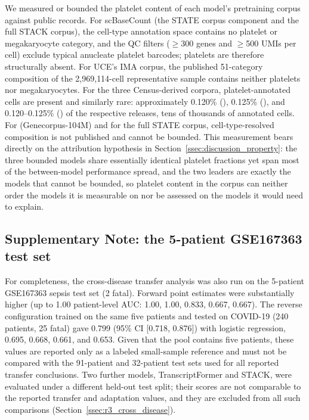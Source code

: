 We measured or bounded the platelet content of each model's pretraining
corpus against public records. For scBaseCount (the STATE corpus component
and the full STACK corpus), the cell-type annotation space contains no
platelet or megakaryocyte category, and the QC filters ($\geq$300 genes and
$\geq$500 UMIs per cell) exclude typical anucleate platelet barcodes;
platelets are therefore structurally absent. For UCE's IMA corpus, the
published 51-category composition of the 2{,}969{,}114-cell representative
sample contains neither platelets nor megakaryocytes. For the three
Census-derived corpora, platelet-annotated cells are present and similarly
rare: approximately 0.120\% (), 0.125\% (), and
0.120--0.125\% () of the respective releases, tens of
thousands of annotated cells. For  (Genecorpus-104M) and
for the full STATE corpus, cell-type-resolved composition is not published
and cannot be bounded. This measurement bears directly on the attribution
hypothesis in Section~\ref{ssec:discussion_property}: the three bounded
models share essentially identical platelet fractions yet span most of the
between-model performance spread, and the two leaders are exactly the models
that cannot be bounded, so platelet content in the corpus can neither order
the models it is measurable on nor be assessed on the models it would need
to explain.

\subsection{Supplementary Note: the 5-patient GSE167363 test set}
\label{sn:gse167363_testset}

For completeness, the cross-disease transfer analysis was also run on the
5-patient GSE167363 sepsis test set (2 fatal). Forward point estimates were
substantially higher (up to 1.00 patient-level AUC:  1.00,
 1.00,  0.833,  0.667,
 0.667). The reverse configuration trained on the same five
patients and tested on COVID-19 (240 patients, 25 fatal) gave 
0.799 (95\% CI [0.718, 0.876]) with logistic regression, 
0.695,  0.668,  0.661, and  0.653.
Given that the pool contains five patients, these values are reported only as
a labeled small-sample reference and must not be compared with the 91-patient
and 32-patient test sets used for all reported transfer conclusions. Two further
models, TranscriptFormer and STACK, were evaluated under a different held-out
test split; their scores are not comparable to the reported transfer and
adaptation values, and they are excluded from all such comparisons
(Section~\ref{ssec:r3_cross_disease}).

